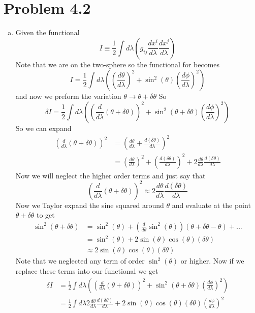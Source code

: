 \documentclass[11pt]{article}
\numberwithin{equation}{section}
\newcommand{\HWnum}{4}
\begin{document}
\section{Problem \HWnum.2}
\begin{enumerate}[(a)]
\item
Given the functional 
$$I \equiv \frac{1}{2}\int d\lambda \left(g_{ij}\frac{dx^i}{d\lambda}\frac{dx^{j}}{d\lambda}\right)$$
Note that we are on the two-sphere so the functional for becomes
$$I = \frac{1}{2}\int d\lambda \left(\left(\frac{d\theta}{d\lambda}\right)^2 + \sin^2(\theta)\left(\frac{d\phi}{d\lambda}\right)^2\right)$$
and now we preform the variation $\theta\rightarrow\theta+\delta\theta$ So 
$$\delta I = \frac{1}{2}\int d\lambda \left(\left(\frac{d}{d\lambda}(\theta+\delta\theta)\right)^2 + \sin^2(\theta+\delta\theta)\left(\frac{d\phi}{d\lambda}\right)^2\right)$$
So we can expand 
\begin{align*}
\left(\frac{d}{d\lambda}(\theta+\delta\theta)\right)^2 &= \left(\frac{d\theta}{d\lambda} + \frac{d(\delta\theta)}{d\lambda}\right)^2\\
&= \left(\frac{d\theta}{d\lambda}\right)^2 + \left(\frac{d(\delta\theta)}{d\lambda}\right)^2 + 2\frac{d\theta}{d\lambda}\frac{d(\delta\theta)}{d\lambda}
\end{align*}
Now we will neglect the higher order terms and just say that
$$\left(\frac{d}{d\lambda}(\theta+\delta\theta)\right)^2 \approx  2\frac{d\theta}{d\lambda}\frac{d(\delta\theta)}{d\lambda}$$
Now we Taylor expand the sine squared around $\theta$ and evaluate at the point $\theta+\delta\theta$ to get
\begin{align*}
\sin^2(\theta+\delta\theta) &= \sin^2(\theta) + \left(\frac{d}{d\theta}\sin^2(\theta)\right)(\theta+\delta\theta - \theta) + ...\\
&= \sin^2(\theta) + 2\sin(\theta)\cos(\theta)(\delta\theta)\\
&\approx 2\sin(\theta)\cos(\theta)(\delta\theta)
\end{align*}
Note that we neglected any term of order $\sin^2(\theta)$ or higher. Now if we replace these terms into our functional we get
\begin{align*}
\delta I &= \frac{1}{2}\int d\lambda \left(\left(\frac{d}{d\lambda}(\theta+\delta\theta)\right)^2 + \sin^2(\theta+\delta\theta)\left(\frac{d\phi}{d\lambda}\right)^2\right)\\
&= \frac{1}{2}\int d\lambda 2\frac{d\theta}{d\lambda}\frac{d(\delta\theta)}{d\lambda} + 2\sin(\theta)\cos(\theta)(\delta\theta)\left(\frac{d\phi}{d\lambda}\right)^2\\

\end{align*}
\end{enumerate}
\end{document}
